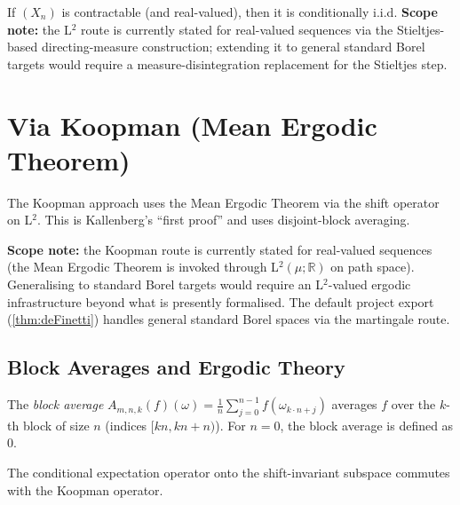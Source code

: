 \begin{theorem}
  \label{thm:conditionallyIID_of_contractable_L2}
  \leanok
  If $(X_n)$ is contractable (and real-valued), then it is conditionally i.i.d.
  \textbf{Scope note:} the L$^2$ route is currently stated for real-valued sequences
  via the Stieltjes-based directing-measure construction; extending it to general
  standard Borel targets would require a measure-disintegration replacement for the
  Stieltjes step.
\end{theorem}


\section{Via Koopman (Mean Ergodic Theorem)}

The Koopman approach uses the Mean Ergodic Theorem via the shift operator on L$^2$.
This is Kallenberg's ``first proof'' and uses disjoint-block averaging.

\textbf{Scope note:} the Koopman route is currently stated for real-valued sequences
(the Mean Ergodic Theorem is invoked through L$^2(\mu; \mathbb{R})$ on path space).
Generalising to standard Borel targets would require an L$^2$-valued ergodic infrastructure
beyond what is presently formalised. The default project export
(\ref{thm:deFinetti}) handles general standard Borel spaces via the martingale route.

\subsection{Block Averages and Ergodic Theory}

\begin{definition}
  \label{def:blockAvg}
  \leanok
  The \emph{block average} $A_{m,n,k}(f)(\omega) = \frac{1}{n} \sum_{j=0}^{n-1} f(\omega_{k \cdot n + j})$
  averages $f$ over the $k$-th block of size $n$ (indices $[kn, kn+n)$).
  For $n = 0$, the block average is defined as $0$.
\end{definition}

\begin{lemma}
  \label{lem:koopman_condexp_comm}
  \leanok
  The conditional expectation operator onto the shift-invariant subspace
  commutes with the Koopman operator.
\end{lemma}

